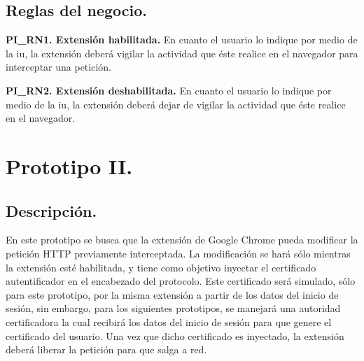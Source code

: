 \documentclass[12pt, a4paper, titlepage]{report}
\begin{document}
			\subsection{Reglas del negocio.}
				{\setlength{\parindent}{12pt}
			
				\textbf{PI\_RN1. Extensión habilitada.} En cuanto el usuario lo indique por medio de la \acrlong{iu}, la extensión deberá vigilar la actividad que éste realice en el navegador para interceptar una petición.\\
				\label{PI_RN1}
				
				\textbf{PI\_RN2. Extensión deshabilitada.} En cuanto el usuario lo indique por medio de la \acrlong{iu}, la extensión deberá dejar de vigilar la actividad que éste realice en el navegador.
				\label{PI_RN2}
				}
				
                \newpage
                
		
		\section{Prototipo II.}
		    \subsection{Descripción.}
		    En este prototipo se busca que la extensión de Google Chrome pueda modificar la petición HTTP previamente interceptada. La modificación se hará sólo mientras la extensión esté habilitada, y tiene como objetivo inyectar el certificado autentificador en el encabezado del protocolo. Este certificado será simulado, sólo para este prototipo, por la misma extensión a partir de los datos del inicio de sesión, sin embargo, para los siguientes prototipos, se manejará una autoridad certificadora la cual recibirá los datos del inicio de sesión para que genere el certificado del usuario. Una vez que dicho certificado es inyectado, la extensión deberá liberar la petición para que salga a red.\\
		    
\end{document}
